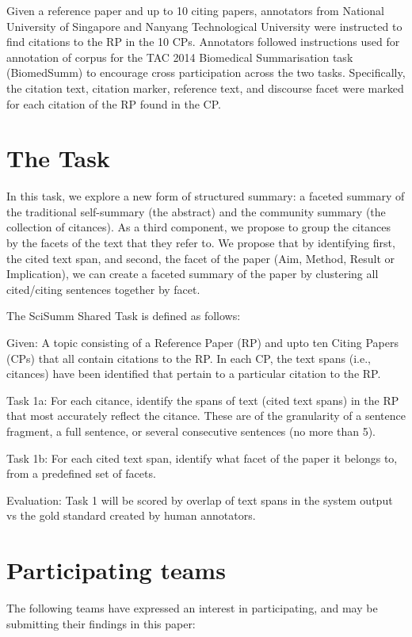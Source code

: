 \documentclass[11pt]{article}
\begin{document}
Given a reference paper and up to 10 citing papers, annotators from 
National University of Singapore and Nanyang Technological University 
were instructed to find citations to the RP in the 10 CPs. Annotators 
followed instructions used for annotation of corpus for the TAC 2014 
Biomedical Summarisation task (BiomedSumm) to encourage cross 
participation across the two tasks. 
Specifically, the citation text, citation marker, reference text, and 
discourse facet were marked for each citation of the RP found in the CP.

\section{The Task}
In this task, we explore a new form of structured summary: a faceted summary of the traditional self-summary (the abstract) and the community summary (the collection of citances).  As a third component, we propose to group the citances by the facets of the text that they refer to. We propose that by identifying first, the cited text span, and second, the facet of the paper 
(Aim, Method, Result or Implication), we can create a faceted summary of the paper by clustering all cited/citing sentences together by facet.

The SciSumm Shared Task is defined as follows:

Given: A topic consisting of a Reference Paper (RP) and upto ten Citing Papers (CPs) that all contain citations to the RP. In each CP, the text spans (i.e., citances) have been identified that pertain to a particular citation to the RP.

Task 1a: For each citance, identify the spans of text (cited text spans) in the RP that most accurately reflect the citance. These are of the granularity of a sentence fragment, a full sentence, or several consecutive sentences (no more than 5).

Task 1b: For each cited text span, identify what facet of the paper it belongs to, from a predefined set of facets.

Evaluation: Task 1 will be scored by overlap of text spans in the system output vs the gold standard created by human annotators.

\section{Participating teams}
The following teams have expressed an interest in participating, and may be submitting their findings in this paper:
\end{document}
